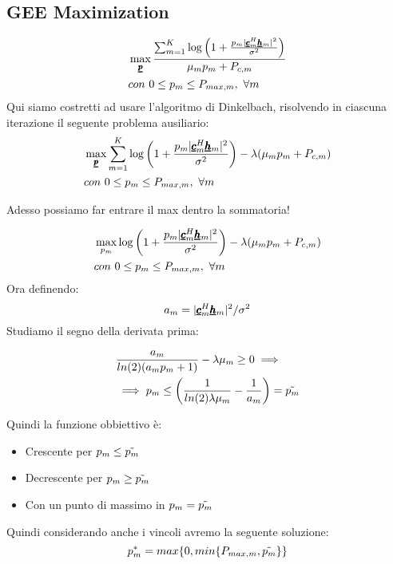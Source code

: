 \subsection{GEE Maximization}
\begin{equation*}
    \begin{aligned}
    &\max_{\pmb{\underline{p}}} \frac{\sum_{m=1}^K \log\left(1 + \frac{p_m |\pmb{\underline{c}}_m^H \pmb{\underline{h}}_m |^2}{\sigma^2} \right)}{\mu_m p_m + P_{c,m}} \\
    &con \ 0 \leq p_m \leq P_{max,m}, \ \forall m
    \end{aligned}
\end{equation*}
Qui siamo costretti ad usare l'algoritmo di Dinkelbach, risolvendo in ciascuna iterazione il seguente problema ausiliario:
\begin{equation*}
    \begin{aligned}
    &\max_{\pmb{\underline{p}}} \sum_{m=1}^K \log\left(1 + \frac{p_m |\pmb{\underline{c}}_m^H \pmb{\underline{h}}_m |^2}{\sigma^2} \right) - \lambda(\mu_m p_m + P_{c,m})
    \\
    &con \ 0 \leq p_m \leq P_{max,m}, \ \forall m
    \end{aligned}
\end{equation*}
\begin{center}
    Adesso possiamo far entrare il max dentro la sommatoria!
\end{center}
\begin{equation*}
    \begin{aligned}
     &\max_{p_m}\log\left(1 + \frac{p_m |\pmb{\underline{c}}_m^H \pmb{\underline{h}}_m |^2}{\sigma^2} \right) - \lambda(\mu_m p_m + P_{c,m}) \\
     & con  \ 0 \leq p_m \leq P_{max,m}, \ \forall m
    \end{aligned}
\end{equation*}
Ora definendo:
\begin{equation*}
    a_m = |\pmb{\underline{c}}_m^H \pmb{\underline{h}}_m |^2 / \sigma^2
\end{equation*}
Studiamo il segno della derivata prima:

\begin{equation*}
    \begin{aligned}
    &\frac{a_m}{ln(2) (a_m p_m +1)} - \lambda \mu_m \geq 0 \implies \\
    &\implies p_m \leq \left(\frac{1}{ln(2)\lambda \mu_m } - \frac{1}{a_m}\right) = \Tilde{p_m}
    \end{aligned}
\end{equation*}

Quindi la funzione obbiettivo è:
\begin{itemize}
    \item Crescente per $p_m \leq \Tilde{p_m}$
    \item Decrescente per $p_m \geq \Tilde{p_m}$
    \item Con un punto di massimo in $p_m = \Tilde{p_m}$
\end{itemize}  
Quindi considerando anche i vincoli avremo la seguente soluzione:
\begin{equation*}
    p_m^* = max\{0, min\{P_{max,m},\Tilde{p_m} \}\}
\end{equation*}


